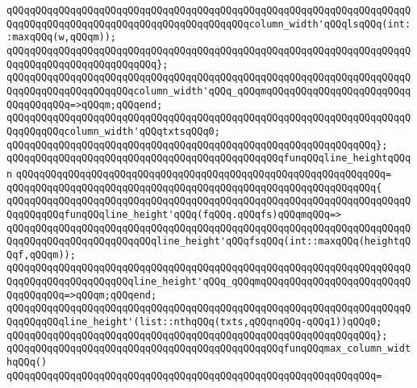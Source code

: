 \newline
\verb|qQQqqQQqqQQqqQQqqQQqqQQqqQQqqQQqqQQqqQQqqQQqqQQqqQQqqQQqqQQqqQQqqQQqqQQqqQQqqQQqqQQqqQQqqQQqqQQqqQQqqQQqqQQqqQQqcolumn_width'qQQqlsqQQq(int::maxqQQq(w,qQQqm));|\newline
\verb|qQQqqQQqqQQqqQQqqQQqqQQqqQQqqQQqqQQqqQQqqQQqqQQqqQQqqQQqqQQqqQQqqQQqqQQqqQQqqQQqqQQqqQQqqQQqqQQq};|\newline
\verb|qQQqqQQqqQQqqQQqqQQqqQQqqQQqqQQqqQQqqQQqqQQqqQQqqQQqqQQqqQQqqQQqqQQqqQQqqQQqqQQqqQQqqQQqqQQqcolumn_width'qQQq_qQQqmqQQqqQQqqQQqqQQqqQQqqQQqqQQqqQQqqQQq=>qQQqm;qQQqend;|\newline
\newline
\verb|qQQqqQQqqQQqqQQqqQQqqQQqqQQqqQQqqQQqqQQqqQQqqQQqqQQqqQQqqQQqqQQqqQQqqQQqqQQqqQQqcolumn_width'qQQqtxtsqQQq0;|\newline
\verb|qQQqqQQqqQQqqQQqqQQqqQQqqQQqqQQqqQQqqQQqqQQqqQQqqQQqqQQqqQQqqQQq};|\newline
\newline
\verb|qQQqqQQqqQQqqQQqqQQqqQQqqQQqqQQqqQQqqQQqqQQqqQQqfunqQQqline_heightqQQqn|\newline
\verb|qQQqqQQqqQQqqQQqqQQqqQQqqQQqqQQqqQQqqQQqqQQqqQQqqQQqqQQqqQQqqQQq=|\newline
\verb|qQQqqQQqqQQqqQQqqQQqqQQqqQQqqQQqqQQqqQQqqQQqqQQqqQQqqQQqqQQqqQQq{|\newline
\verb|qQQqqQQqqQQqqQQqqQQqqQQqqQQqqQQqqQQqqQQqqQQqqQQqqQQqqQQqqQQqqQQqqQQqqQQqqQQqqQQqfunqQQqline_height'qQQq(fqQQq.qQQqfs)qQQqmqQQq=>|\newline
\verb|qQQqqQQqqQQqqQQqqQQqqQQqqQQqqQQqqQQqqQQqqQQqqQQqqQQqqQQqqQQqqQQqqQQqqQQqqQQqqQQqqQQqqQQqqQQqqQQqline_height'qQQqfsqQQq(int::maxqQQq(heightqQQqf,qQQqm));|\newline
\verb|qQQqqQQqqQQqqQQqqQQqqQQqqQQqqQQqqQQqqQQqqQQqqQQqqQQqqQQqqQQqqQQqqQQqqQQqqQQqqQQqqQQqqQQqqQQqline_height'qQQq_qQQqmqQQqqQQqqQQqqQQqqQQqqQQqqQQqqQQqqQQq=>qQQqm;qQQqend;|\newline
\newline
\verb|qQQqqQQqqQQqqQQqqQQqqQQqqQQqqQQqqQQqqQQqqQQqqQQqqQQqqQQqqQQqqQQqqQQqqQQqqQQqqQQqline_height'(list::nthqQQq(txts,qQQqnqQQq-qQQq1))qQQq0;|\newline
\verb|qQQqqQQqqQQqqQQqqQQqqQQqqQQqqQQqqQQqqQQqqQQqqQQqqQQqqQQqqQQqqQQq};|\newline
\newline
\verb|qQQqqQQqqQQqqQQqqQQqqQQqqQQqqQQqqQQqqQQqqQQqqQQqfunqQQqmax_column_widthqQQq()|\newline
\verb|qQQqqQQqqQQqqQQqqQQqqQQqqQQqqQQqqQQqqQQqqQQqqQQqqQQqqQQqqQQqqQQq=|\newline
